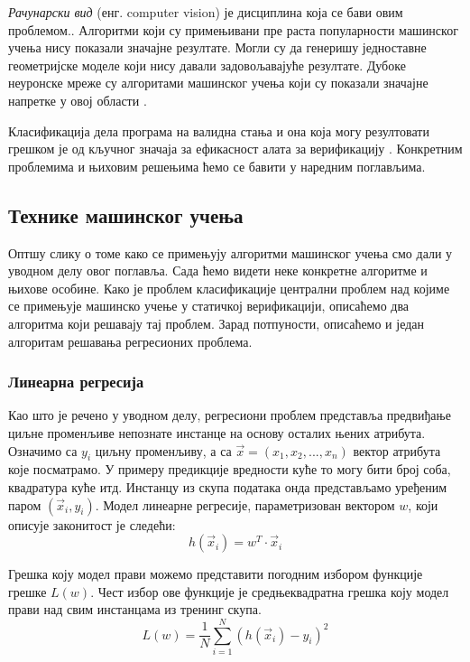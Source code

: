 \documentclass[a4paper]{article}
\begin{document}
{\textit{Рачунарски вид} (енг. computer vision) је дисциплина која се бави овим проблемом.\cite{old-cv}. Алгоритми који су примењивани пре раста популарности машинског учења нису показали значајне резултате. Могли су да генеришу једноставне геометријске моделе који нису давали задовољавајуће резултате. Дубоке неуронске мреже су алгоритами машинског учења који су показали значајне напретке у овој области \cite{new-cv}.


Класификација дела програма на валидна стања и она која могу резултовати грешком је од кључног значаја за ефикасност алата за верификацију \cite{Brun04findinglatent} \cite{KrishnaPW15}. Конкретним проблемима и њиховим решењима ћемо се бавити у наредним поглављима.


\subsection{Технике машинског учења}
Оптшу слику о томе како се примењују алгоритми машинског учења смо дали у уводном делу овог поглавља. Сада ћемо видети неке конкретне алгоритме и њихове особине. Како је проблем класификације централни проблем над којиме се примењује машинско учење у статичкој верификацији, описаћемо два алгоритма који решавају тај проблем. Зарад потпуности, описаћемо и један алгоритам решавања регресионих проблема.


\subsubsection*{Линеарна регресија}
Као што је речено у уводном делу, регресиони проблем представља предвиђање циљне променљиве непознате инстанце на основу осталих њених атрибута. Означимо са $y_i$ циљну променљиву, а са $\vec{x} = (x_1, x_2, ..., x_n)$ вектор атрибута које посматрамо. У примеру предикције вредности куће то могу бити број соба, квадратура куће итд. Инстанцу из скупа података онда представљамо уређеним паром $(\vec{x}_i, y_i)$. Модел линеарне регресије, параметризован вектором $w$, који описује законитост је следећи:
\begin{equation}
    h(\vec{x}_i) = w^T \cdot \vec{x}_i
\end{equation}


Грешка коју модел прави можемо представити погодним избором функције грешке $L(w)$. Чест избор ове функције је средњеквадратна грешка коју модел прави над свим инстанцама из тренинг скупа.
\begin{equation}
L(w) = \frac{1}{N}\sum \limits_{i=1}^{N} (h(\vec{x}_i) - y_i)^2
\end{equation}

}
\end{document}
